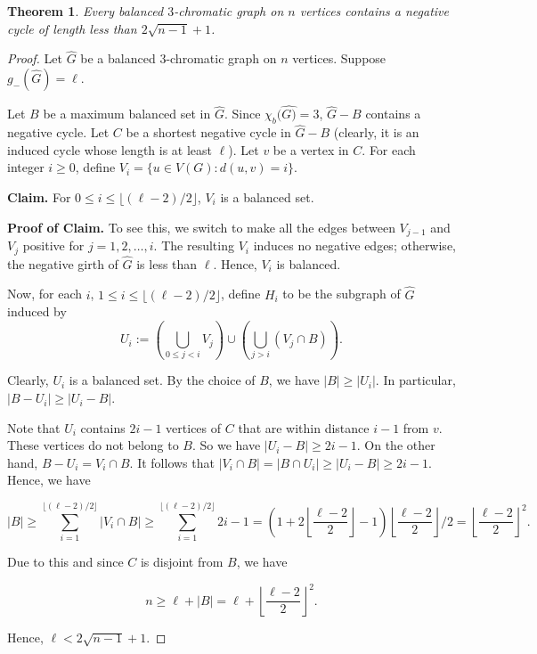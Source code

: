 \documentclass{article}
\newtheorem{theorem}{Theorem}[section]
\begin{document}
\begin{theorem}\label{thm:balanced3XGraphs}
    Every balanced $3$-chromatic graph on $n$ vertices contains a negative cycle of length less than $2\sqrt{n-1}+1$.
\end{theorem}


\begin{proof}
    Let $\widehat{G}$ be a balanced $3$-chromatic graph on $n$ vertices. Suppose $g_-(\widehat{G})=\ell$.

    Let $B$ be a maximum balanced set in $\widehat{G}$. Since $\chi_b(\widehat{G)}=3$, $\widehat{G}-B$ contains a negative cycle. Let $C$ be a shortest negative cycle in $\widehat{G}-B$ (clearly, it is an induced cycle whose length is at least $\ell$). Let $v$ be a vertex in $C$. For each integer $i\geq 0$, define $V_i=\{u\in V(G): d(u,v)=i\}$.

    \textbf{Claim.} For $0\leq i\leq \lfloor(\ell-2)/2\rfloor$, $V_i$ is a balanced set.

    \textbf{Proof of Claim.} To see this, we switch to make all the edges between $V_{j-1}$ and $V_j$ positive for $j=1,2,\ldots, i$. The resulting $V_i$ induces no negative edges; otherwise, the negative girth of $\widehat{G}$ is less than $\ell$. Hence, $V_i$ is balanced.

    Now, for each $i$, $1\leq i\leq \lfloor(\ell-2)/2\rfloor$, define $H_i$ to be the subgraph of $\widehat{G}$ induced by 
    $$U_i:=\left(\bigcup_{0\leq j<i}V_j\right)\cup \left(\bigcup_{j>i}(V_j\cap B)\right).$$

    Clearly, $U_i$ is a balanced set. By the choice of $B$, we have $|B|\geq |U_i|$. In particular, $|B-U_i|\geq |U_i-B|$.

    Note that $U_i$ contains $2i-1$ vertices of $C$ that are within distance $i-1$ from $v$. These vertices do not belong to $B$. So we have $|U_i-B|\geq 2i-1$. On the other hand, $B-U_i=V_i\cap B$. It follows that $|V_i\cap B|=|B\cap U_i|\geq |U_i-B|\geq 2i-1$. Hence, we have

    $$|B|\geq \sum_{i=1}^{\lfloor(\ell-2)/2\rfloor} |V_i\cap B|\geq \sum_{i=1}^{\lfloor(\ell-2)/2\rfloor} 2i-1= \left(1+2\left\lfloor\frac{\ell-2}{2}\right\rfloor-1\right)\left\lfloor\frac{\ell-2}{2}\right\rfloor/2=\left\lfloor\frac{\ell-2}{2}\right\rfloor^2.$$

    Due to this and since $C$ is disjoint from $B$, we have

    $$n\geq \ell+|B|=\ell+\left\lfloor\frac{\ell-2}{2}\right\rfloor^2.$$

    Hence, $\ell<2\sqrt{n-1}+1$.
\end{proof}
\end{document}
